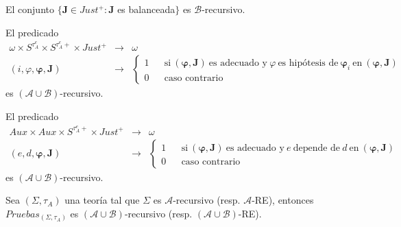   \begin{lemma} \label{lemma_109}
    \PN El conjunto $\{\mathbf{J} \in Just^{+}: \mathbf{J}$ es balanceada$\}$ es $\mathcal{B}$-recursivo.
  \end{lemma}

  \begin{lemma} \label{lemma_110}
    \PN El predicado
    \[
      \begin{array}{rcl}
        \omega \times S^{\tau_{A}^{e}} \times S^{\tau_{A}^{e}+} \times Just^{+} &\rightarrow& \omega \\
        (i, \varphi, \pmb{\varphi}, \mathbf{J}) &\rightarrow& \left\{
          \begin{array}{ccl}
            1 && \text{si} \ (\pmb{\varphi}, \mathbf{J}) \ \text{es adecuado y} \ \varphi \ \text{es hipótesis de} \
              \pmb{\varphi}_{i} \ \text{en} \ (\pmb{\varphi}, \mathbf{J}) \\
            0 && \text{caso contrario}
          \end{array}\right.
      \end{array}
    \]
    \PN es $(\mathcal{A} \cup \mathcal{B})$-recursivo.
  \end{lemma}

  \begin{lemma} \label{lemma_111}
    \PN El predicado
    \[
      \begin{array}{rcl}
        Aux \times Aux \times S^{\tau_{A}^{e}+} \times Just^{+} &\rightarrow& \omega \\
        (e, d, \pmb{\varphi}, \mathbf{J}) &\rightarrow& \left\{
          \begin{array}{ccl}
            1 && \text{si} \ (\pmb{\varphi}, \mathbf{J}) \ \text{es adecuado y} \ e \ \text{depende de} \ d \ \text{en}
              \ (\pmb{\varphi}, \mathbf{J}) \\
            0 && \text{caso contrario}
          \end{array}\right.
      \end{array}
    \]
    \PN es $(\mathcal{A} \cup \mathcal{B})$-recursivo.
  \end{lemma}

  \begin{lemma} \label{lemma_112}
    \PN Sea $(\Sigma, \tau_{A})$ una teoría tal que $\Sigma$ es $\mathcal{A}$-recursivo (resp. $\mathcal{A}$-RE),
    entonces $Pruebas_{(\Sigma, \tau_{A})}$ es $(\mathcal{A} \cup \mathcal{B})$-recursivo (resp. $(\mathcal{A} \cup
    \mathcal{B})$-RE).
  \end{lemma}


